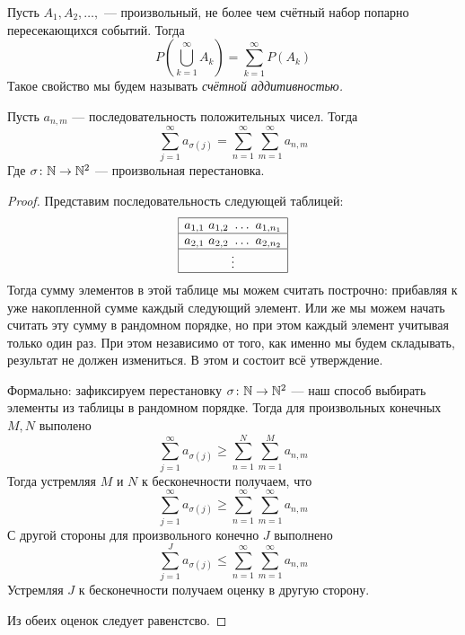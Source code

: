 \begin{definition}
    Пусть $A_1, A_{2}, \ldots, $ --- произвольный, не более чем счётный набор попарно пересекающихся событий. Тогда
    \[
        P\left( \bigcup\limits_{k = 1}^{\infty}A_k \right) = \sum\limits_{k = 1}^{\infty} P(A_k)
    \]
    Такое свойство мы будем называть \it{счётной аддитивностью}.
\end{definition}
\begin{lemma}
    \label{lemma_1.1}
    Пусть $a_{n, m}$ --- последовательность положительных чисел. Тогда
    \[
        \sum\limits_{j = 1}^{\infty} a_{\sigma(j)} =
        \sum\limits_{n = 1}^{\infty}\sum\limits_{m = 1}^{\infty}
        a_{n, m}
    \]
    Где $\sigma \colon \mathbb{N} \to \mathbb{N}^2$ --- произвольная перестановка.
\end{lemma}
\begin{proof}
    Представим последовательность следующей таблицей:
    \[
        \begin{array}{|c|}
            \hline
            a_{1, 1}~ a_{1, 2}~ \ldots~ a_{1, n_1} \\
            \hline
            a_{2, 1}~ a_{2, 2}~ \ldots~ a_{2, n_2} \\
            \hline
            \vdots                                 \\
            \hline
        \end{array}
    \]
    Тогда сумму элементов в этой таблице мы можем считать построчно: прибавляя к уже накопленной сумме
    каждый следующий элемент. Или же мы можем начать считать эту сумму в рандомном порядке, но при этом
    каждый элемент учитывая только один раз. При этом независимо от того, как именно мы будем складывать,
    результат не должен измениться. В этом и состоит всё утверждение.

    Формально: зафиксируем перестановку $\sigma \colon \mathbb{N} \to \mathbb{N}^2$ --- наш способ выбирать элементы
    из таблицы в рандомном порядке. Тогда для произвольных конечных $M, N$ выполено
    \[
        \sum\limits_{j = 1}^{\infty} a_{\sigma(j)} \geq
        \sum\limits_{n = 1}^{N}\sum\limits_{m = 1}^{M} a_{n, m}
    \]
    Тогда устремляя $M$ и $N$ к бесконечности получаем, что
    \[
        \sum\limits_{j = 1}^{\infty} a_{\sigma(j)} \geq
        \sum\limits_{n = 1}^{\infty}\sum\limits_{m = 1}^{\infty}
        a_{n, m}
    \]
    С другой стороны для произвольного конечно $J$ выполнено
    \[
        \sum\limits_{j = 1}^{J} a_{\sigma(j)} \leq
        \sum\limits_{n = 1}^{\infty}\sum\limits_{m = 1}^{\infty} a_{n, m}
    \]
    Устремляя $J$ к бесконечности получаем оценку в другую сторону.

    Из обеих оценок следует равенстсво.
\end{proof}
